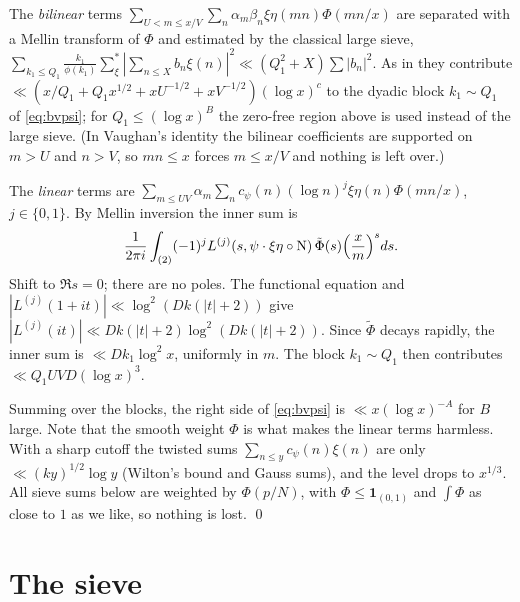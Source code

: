 \documentclass[11pt]{amsart}
\theoremstyle{remark}
\begin{document}
The \emph{bilinear} terms $\sum_{U<m\le x/V}\sum_n\alpha_m\beta_n\xi\eta(mn)\Phi(mn/x)$ are separated with a Mellin transform of $\Phi$ and estimated by the classical large sieve, $\sum_{k_1\le Q_1}\frac{k_1}{\phi(k_1)}\sum^*_\xi|\sum_{n\le X}b_n\xi(n)|^2\ll(Q_1^2+X)\sum|b_n|^2$. As in \cite[Ch.~28]{Davenport} they contribute $\ll(x/Q_1+Q_1x^{1/2}+xU^{-1/2}+xV^{-1/2})(\log x)^{c}$ to the dyadic block $k_1\sim Q_1$ of \eqref{eq:bvpsi}; for $Q_1\le(\log x)^{B}$ the zero-free region above is used instead of the large sieve. (In Vaughan's identity the bilinear coefficients are supported on $m>U$ and $n>V$, so $mn\le x$ forces $m\le x/V$ and nothing is left over.)

The \emph{linear} terms are $\sum_{m\le UV}\alpha_m\sum_nc_\psi(n)(\log n)^j\xi\eta(n)\Phi(mn/x)$, $j\in\{0,1\}$. By Mellin inversion the inner sum is
\[
\frac1{2\pi i}\int_{(2)}(-1)^jL^{(j)}(s,\psi\cdot\xi\eta\circ{\rm N})\,\tilde\Phi(s)\Bigl(\frac xm\Bigr)^sds .
\]
Shift to $\Re s=0$; there are no poles. The functional equation and $|L^{(j)}(1+it)|\ll\log^2(Dk(|t|+2))$ give $|L^{(j)}(it)|\ll Dk(|t|+2)\log^2(Dk(|t|+2))$. Since $\tilde\Phi$ decays rapidly, the inner sum is $\ll Dk_1\log^2x$, uniformly in $m$. The block $k_1\sim Q_1$ then contributes $\ll Q_1UV D(\log x)^3$.

Summing over the blocks, the right side of \eqref{eq:bvpsi} is $\ll x(\log x)^{-A}$ for $B$ large. Note that the smooth weight $\Phi$ is what makes the linear terms harmless. With a sharp cutoff the twisted sums $\sum_{n\le y}c_\psi(n)\xi(n)$ are only $\ll(ky)^{1/2}\log y$ (Wilton's bound and Gauss sums), and the level drops to $x^{1/3}$. All sieve sums below are weighted by $\Phi(p/N)$, with $\Phi\le\mathbf 1_{(0,1)}$ and $\int\Phi$ as close to $1$ as we like, so nothing is lost. \qed

\section{The sieve}\label{sec:sieve}
\end{document}
